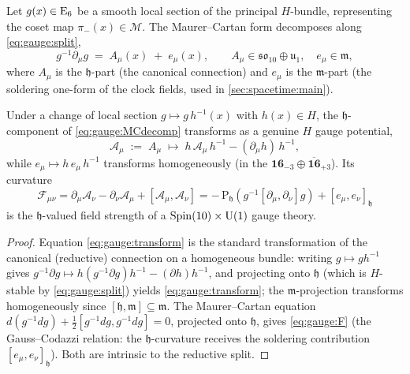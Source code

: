 Let $g(x)\in\mathrm{E}_{6}$ be a smooth local section of the principal $H$-bundle,
representing the coset map $\pi_-(x)\in\mathcal M$. The Maurer--Cartan
form decomposes along \eqref{eq:gauge:split},
\begin{equation}\label{eq:gauge:MCdecomp}
  g^{-1}\partial_\mu g
  \;=\;
  A_\mu(x) \;+\; e_\mu(x),
  \qquad
  A_\mu\in\mathfrak{so}_{10}\oplus\mathfrak u_{1},
  \quad
  e_\mu\in\mathfrak m,
\end{equation}
where $A_\mu$ is the $\mathfrak h$-part (the canonical connection) and
$e_\mu$ is the $\mathfrak m$-part (the soldering one-form of the clock
fields, used in \autoref{sec:spacetime:main}).

\begin{theorem}\label{thm:gauge:composite}
Under a change of local section $g\mapsto g\,h^{-1}(x)$ with
$h(x)\in H$, the $\mathfrak h$-component of \eqref{eq:gauge:MCdecomp}
transforms as a genuine $H$ gauge potential,
\begin{equation}\label{eq:gauge:transform}
  \mathcal A_\mu \;:=\; A_\mu
  \;\longmapsto\;
  h\,\mathcal A_\mu\,h^{-1} - (\partial_\mu h)\,h^{-1},
\end{equation}
while $e_\mu\mapsto h\,e_\mu\,h^{-1}$ transforms homogeneously (in the
$\mathbf{16}_{-3}\oplus\overline{\mathbf{16}}_{+3}$). Its curvature
\begin{equation}\label{eq:gauge:F}
  \mathcal F_{\mu\nu}
  =\partial_\mu\mathcal A_\nu-\partial_\nu\mathcal A_\mu
   +[\mathcal A_\mu,\mathcal A_\nu]
  = -\,\mathrm P_{\mathfrak h}\!\left(g^{-1}[\partial_\mu,\partial_\nu]g\right)
    + [e_\mu,e_\nu]_{\mathfrak h}
\end{equation}
is the $\mathfrak h$-valued field strength of a $\operatorname{Spin}(10)\times\mathrm{U}(1)$
gauge theory.
\end{theorem}

\begin{proof}
Equation \eqref{eq:gauge:transform} is the standard transformation of the
canonical (reductive) connection on a homogeneous bundle: writing
$g\mapsto gh^{-1}$ gives
$g^{-1}\partial g\mapsto h(g^{-1}\partial g)h^{-1}-(\partial h)h^{-1}$,
and projecting onto $\mathfrak h$ (which is $H$-stable by
\eqref{eq:gauge:split}) yields \eqref{eq:gauge:transform}; the
$\mathfrak m$-projection transforms homogeneously since
$[\mathfrak h,\mathfrak m]\subseteq\mathfrak m$. The Maurer--Cartan
equation $d(g^{-1}dg)+\tfrac12[g^{-1}dg,g^{-1}dg]=0$, projected onto
$\mathfrak h$, gives \eqref{eq:gauge:F} (the Gauss--Codazzi relation:
the $\mathfrak h$-curvature receives the soldering contribution
$[e_\mu,e_\nu]_{\mathfrak h}$). Both are intrinsic to the reductive split.
\end{proof}

